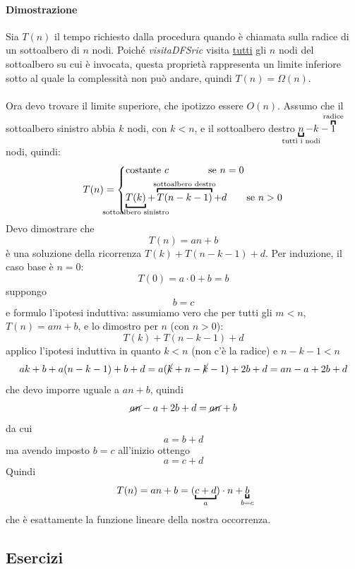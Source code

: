 \documentclass[italian]{article}
\newcommand{\varOmicron}{O}
\begin{document}
\paragraph{Dimostrazione} Sia $T(n)$ il tempo richiesto dalla procedura quando è chiamata sulla radice di un sottoalbero di $n$ nodi. Poiché \textit{visitaDFSric} visita \underline{tutti} gli $n$ nodi del sottoalbero su cui è invocata, questa proprietà rappresenta un limite inferiore sotto al quale la complessità non può andare, quindi $T(n) = \varOmega(n)$. \\\\
Ora devo trovare il limite superiore, che ipotizzo essere $\varOmicron(n)$. Assumo che il sottoalbero sinistro abbia $k$ nodi, con $k<n$, e il sottoalbero destro $\underbracket{n}_{\mathclap{\text{tutti i nodi}}}-k-\overbracket{1}^{\mathclap{\text{radice}}}$ nodi, quindi:
\[
	T(n) = 
	\begin{cases*}
		\text{costante } c \qquad\qquad \text{se } n=0 \\
		\underbracket{T(k)}_{\mathclap{\text{sottoalbero sinistro}}} + \overbracket{T(n-k-1)}^{\mathclap{\text{sottoalbero destro}}} + d \qquad \text{se } n>0
	\end{cases*}
\]
Devo dimostrare che 
\[
	T(n) = an + b
\]
è una soluzione della ricorrenza $T(k) + T(n-k-1) + d$. Per induzione, il caso base è $n=0$:
\[
	T(0) = a\cdot 0 + b = b
\]
suppongo
\[
	b=c
\] 
e formulo l'ipotesi induttiva: assumiamo vero che per tutti gli $ m < n$, $T(n)=am+b$, e lo dimostro per $n$ (con $n>0$):
\[
	T(k) + T(n-k-1) + d
\]
applico l'ipotesi induttiva in quanto $k<n$ (non c'è la radice) e $n-k-1 < n$
\[
	ak+b+a(n-k-1)+b+d = a(\cancel{k}+n-\cancel{k}-1) + 2b + d = an-a+2b+d
\]
che devo imporre uguale a $an+b$, quindi
\[
	\cancel{an}-a+2b+d = \cancel{an}+b
\]
da cui
\[
	a=b+d
\]
ma avendo imposto $b=c$ all'inizio ottengo
\[
	a=c+d
\]
Quindi 
\[
	T(n) = an+b = (\underbracket{c+d}_{\mathclap{a}})\cdot n + \underbracket{b}_{\mathclap{b=c}}
\]
che è esattamente la funzione lineare della nostra occorrenza.
\subsection{Esercizi}
\end{document}
